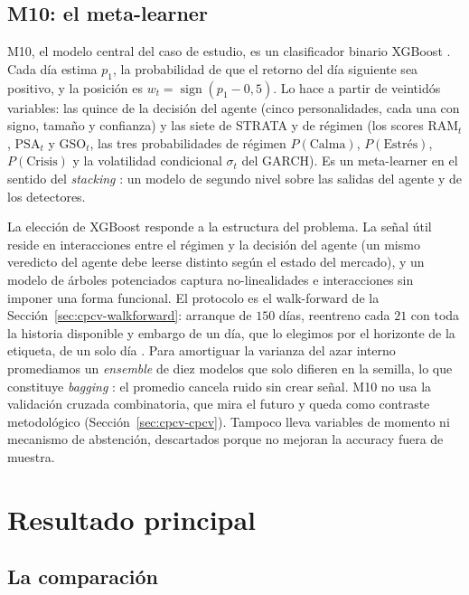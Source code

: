 \subsection{M10: el meta-learner}
\label{sec:smci-m10}

M10, el modelo central del caso de estudio, es un clasificador binario XGBoost \cite{chen2016}. Cada día estima $p_1$, la probabilidad de que el retorno del día siguiente sea positivo, y la posición es $w_t = \operatorname{sign}(p_1 - 0{,}5)$. Lo hace a partir de veintidós variables: las quince de la decisión del agente (cinco personalidades, cada una con signo, tamaño y confianza) y las siete de STRATA y de régimen (los scores $\mathrm{RAM}_t$, $\mathrm{PSA}_t$ y $\mathrm{GSO}_t$, las tres probabilidades de régimen $P(\text{Calma})$, $P(\text{Estrés})$, $P(\text{Crisis})$ y la volatilidad condicional $\sigma_t$ del GARCH). Es un meta-learner en el sentido del \emph{stacking} \cite{wolpert1992}: un modelo de segundo nivel sobre las salidas del agente y de los detectores.

La elección de XGBoost responde a la estructura del problema. La señal útil reside en interacciones entre el régimen y la decisión del agente (un mismo veredicto del agente debe leerse distinto según el estado del mercado), y un modelo de árboles potenciados captura no-linealidades e interacciones sin imponer una forma funcional. El protocolo es el walk-forward de la Sección~\ref{sec:cpcv-walkforward}: arranque de $150$ días, reentreno cada $21$ con toda la historia disponible y embargo de un día, que lo elegimos por el horizonte de la etiqueta, de un solo día \cite{tashman2000, lopezdeprado2018}. Para amortiguar la varianza del azar interno promediamos un \emph{ensemble} de diez modelos que solo difieren en la semilla, lo que constituye \emph{bagging} \cite{breiman1996, dietterich2000}: el promedio cancela ruido sin crear señal. M10 no usa la validación cruzada combinatoria, que mira el futuro y queda como contraste metodológico (Sección~\ref{sec:cpcv-cpcv}). Tampoco lleva variables de momento ni mecanismo de abstención, descartados porque no mejoran la accuracy fuera de muestra.

\section{Resultado principal}
\label{sec:smci-resultado}

\subsection{La comparación}
\label{sec:smci-comparacion}

